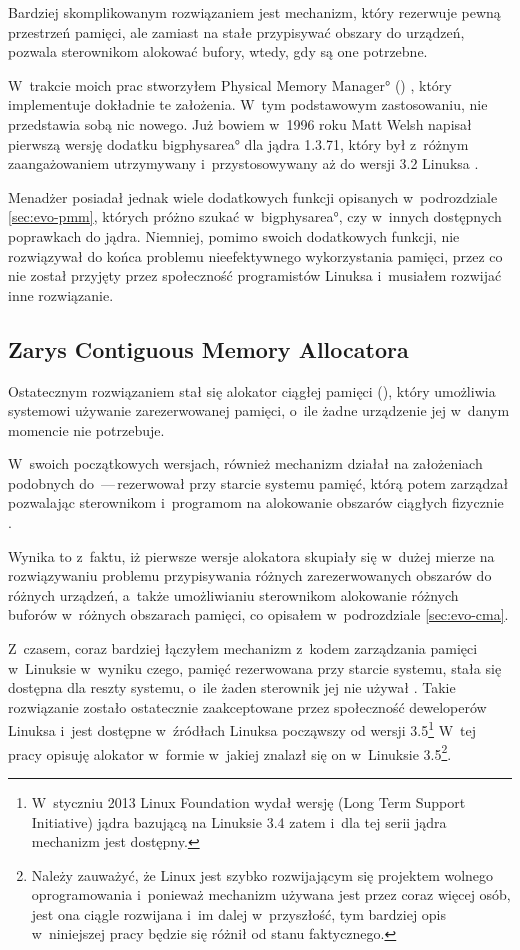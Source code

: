 Bardziej skomplikowanym rozwiązaniem jest mechanizm, który rezerwuje
pewną przestrzeń pamięci, ale zamiast na stałe przypisywać obszary do
urządzeń, pozwala sterownikom alokować bufory, wtedy, gdy są one
potrzebne.

W~trakcie moich prac stworzyłem \ang*{Physical Memory Manager} ()
\autocite{patch:pmm}, który implementuje dokładnie te założenia. W~tym
podstawowym zastosowaniu,  nie przedstawia sobą nic nowego.  Już
bowiem w~1996 roku Matt Welsh napisał pierwszą wersję dodatku
\ang*{bigphysarea} dla jądra 1.3.71, który był z~różnym zaangażowaniem
utrzymywany i~przystosowywany aż do wersji 3.2 Linuksa
\autocite{patch:bigphys}.

Menadżer  posiadał jednak wiele dodatkowych funkcji opisanych
w~podrozdziale \ref{sec:evo-pmm}, których próżno szukać
w~\ang*{bigphysarea}, czy w~innych dostępnych poprawkach do jądra.
Niemniej, pomimo swoich dodatkowych funkcji, nie rozwiązywał do końca
problemu nieefektywnego wykorzystania pamięci, przez co nie został
przyjęty przez społeczność programistów Linuksa i~musiałem rozwijać
inne rozwiązanie.

\subsection{Zarys Contiguous Memory Allocatora}

Ostatecznym rozwiązaniem stał się alokator ciągłej pamięci (),
który umożliwia systemowi używanie zarezerwowanej pamięci, o~ile żadne
urządzenie jej w~danym momencie nie potrzebuje.

W~swoich początkowych wersjach, również mechanizm  działał na
założeniach podobnych do \,---\,rezerwował przy starcie systemu
pamięć, którą potem zarządzał pozwalając sterownikom i~programom na
alokowanie obszarów ciągłych fizycznie \autocite{patch:cma-1}.

Wynika to z~faktu, iż pierwsze wersje alokatora  skupiały się
w~dużej mierze na rozwiązywaniu problemu przypisywania różnych
zarezerwowanych obszarów do różnych urządzeń, a~także umożliwianiu
sterownikom alokowanie różnych buforów w~różnych obszarach pamięci, co
opisałem w~podrozdziale \ref{sec:evo-cma}.

Z~czasem, coraz bardziej łączyłem mechanizm  z~kodem
zarządzania pamięci w~Linuksie w~wyniku czego, pamięć rezerwowana przy
starcie systemu, stała się dostępna dla reszty systemu, o~ile żaden
sterownik jej nie używał \autocite{patch:cma-24}.  Takie rozwiązanie
zostało ostatecznie zaakceptowane przez społeczność deweloperów
Linuksa i~jest dostępne w~źródłach Linuksa począwszy od wersji
3.5\footnote{W~styczniu 2013 Linux Foundation wydał wersję 
  (Long Term Support Initiative) jądra bazującą na Linuksie 3.4
  \autocite{bib:ltsi-34} zatem i~dla tej serii jądra mechanizm
   jest dostępny.}  W~tej pracy opisuję alokator 
w~formie w~jakiej znalazł się on w~Linuksie 3.5\footnote{Należy
  zauważyć, że Linux jest szybko rozwijającym się projektem wolnego
  oprogramowania i~ponieważ mechanizm  używana jest przez
  coraz więcej osób, jest ona ciągle rozwijana i~im dalej
  w~przyszłość, tym bardziej opis w~niniejszej pracy będzie się różnił
  od stanu faktycznego.}.

